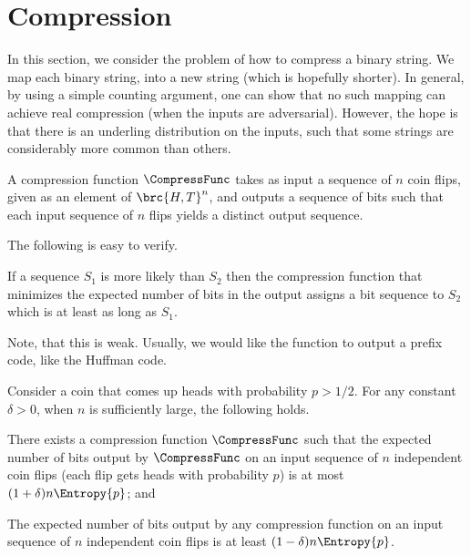
\section{Compression}

In this section, we consider the problem of how to compress a binary
string. We map each binary string, into a new string (which is
hopefully shorter).  In general, by using a simple counting argument,
one can show that no such mapping can achieve real compression (when
the inputs are adversarial). However, the hope is that there is an
underling distribution on the inputs, such that some strings are
considerably more common than others.

\begin{defn}
    A compression function $\CompressFunc$ takes as input a sequence
    of $n$ coin flips, given as an element of $\brc{H,T}^n$, and
    outputs a sequence of bits such that each input sequence of $n$
    flips yields a distinct output sequence.
\end{defn}

The following is easy to verify.
\begin{lemma}
    If a sequence $S_1$ is more likely than $S_2$ then the compression
    function that minimizes the expected number of bits in the output
    assigns a bit sequence to $S_2$ which is at least as long as
    $S_1$. 

\end{lemma}



Note, that this is weak. Usually, we would like the function to output
a prefix code, like the Huffman code.
\begin{theorem}
    Consider a coin that comes up heads with probability $p > 1/2$. For
    any constant $\delta >0$, when $n$ is sufficiently large, the
    following holds.
    \begin{compactenumi}
        \item There exists a compression function $\CompressFunc$ such
        that the expected number of bits output by $\CompressFunc$ on
        an input sequence of $n$ independent coin flips (each flip
        gets heads with probability $p$) is at most $(1+\delta) n
        \Entropy{p}$; and

        \item The expected number of bits output by any compression
        function on an input sequence of $n$ independent coin flips is
        at least $(1-\delta)n \Entropy{p}$.
    \end{compactenumi}
\end{theorem}

